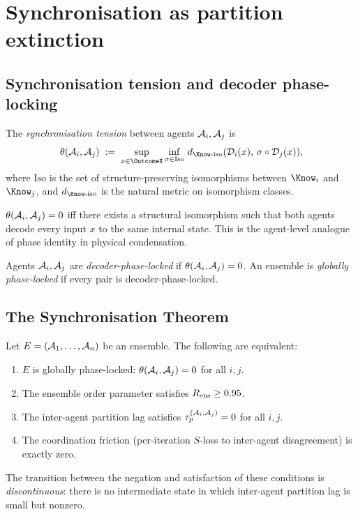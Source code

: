\section{Synchronisation as partition extinction}
\label{sec:ch04-sync}

\subsection{Synchronisation tension and decoder phase-locking}

\begin{definition}\label{def:sync-tens}
The \emph{synchronisation tension} between agents $\mathcal{A}_i,\mathcal{A}_j$ is
\[
\theta(\agent_i,\agent_j)\;:=\;\sup_{x\in\OutcomeX}
  \inf_{\sigma\in\mathrm{Iso}}\,
  d_{\Know\text{-iso}}(\mathcal{D}_i(x),\,\sigma\circ\mathcal{D}_j(x)),
\]
where $\mathrm{Iso}$ is the set of structure-preserving isomorphisms
between $\Know_i$ and $\Know_j$, and $d_{\Know\text{-iso}}$ is the natural
metric on isomorphism classes.
\end{definition}

$\theta(\mathcal{A}_i,\mathcal{A}_j)=0$ iff there exists a structural isomorphism
such that both agents decode every input $x$ to the same internal state.
This is the agent-level analogue of phase identity in physical
condensation.

\begin{definition}\label{def:dec-lock}
Agents $\mathcal{A}_i,\mathcal{A}_j$ are \emph{decoder-phase-locked} if
$\theta(\mathcal{A}_i,\mathcal{A}_j)=0$. An ensemble is \emph{globally phase-locked}
if every pair is decoder-phase-locked.
\end{definition}

\subsection{The Synchronisation Theorem}

\begin{theorem}\label{thm:sync}
Let $E=(\mathcal{A}_1,\dots,\mathcal{A}_n)$ be an ensemble. The following are
equivalent:
\begin{enumerate}[label=(\roman*),leftmargin=*]
\item $E$ is globally phase-locked: $\theta(\mathcal{A}_i,\mathcal{A}_j)=0$ for
  all $i,j$.
\item The ensemble order parameter satisfies $R_{\mathrm{ens}}\ge 0.95$.
\item The inter-agent partition lag satisfies $\tau_p^{(\mathcal{A}_i,\mathcal{A}_j)}=0$
  for all $i,j$.
\item The coordination friction (per-iteration $S$-loss to inter-agent
  disagreement) is exactly zero.
\end{enumerate}
The transition between the negation and satisfaction of these conditions is
\emph{discontinuous}: there is no intermediate state in which inter-agent
partition lag is small but nonzero.
\end{theorem}

